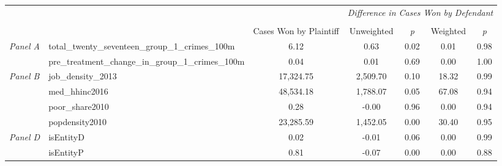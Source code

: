 \begin{tabular}{llccccc}
\toprule
 &  & \textit{} & \multicolumn{4}{c}{\textit{Difference in Cases Won by Defendant}} \\
\cline{4-7}
\\
 &  & Cases Won by Plaintiff & Unweighted & \emph{p} & Weighted & \emph{p} \\
\midrule
\multirow[c]{2}{3cm}{\textit{Panel A}} & total_twenty_seventeen_group_1_crimes_100m & 6.12 & 0.63 & 0.02 & 0.01 & 0.98 \\
 & pre_treatment_change_in_group_1_crimes_100m & 0.04 & 0.01 & 0.69 & 0.00 & 1.00 \\
\cline{1-7}
\multirow[c]{4}{3cm}{\textit{Panel B}} & job_density_2013 & 17,324.75 & 2,509.70 & 0.10 & 18.32 & 0.99 \\
 & med_hhinc2016 & 48,534.18 & 1,788.07 & 0.05 & 67.08 & 0.94 \\
 & poor_share2010 & 0.28 & -0.00 & 0.96 & 0.00 & 0.94 \\
 & popdensity2010 & 23,285.59 & 1,452.05 & 0.00 & 30.40 & 0.95 \\
\cline{1-7}
\multirow[c]{2}{3cm}{\textit{Panel D}} & isEntityD & 0.02 & -0.01 & 0.06 & 0.00 & 0.99 \\
 & isEntityP & 0.81 & -0.07 & 0.00 & 0.00 & 0.88 \\
\cline{1-7}
\bottomrule
\end{tabular}
